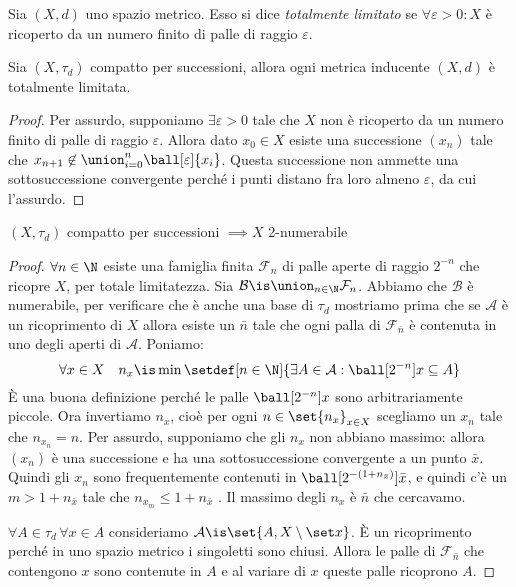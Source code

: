 \begin{defn}
	Sia $(X,d)$ uno spazio metrico.
	Esso si dice \emph{totalmente limitato} se $\forall \varepsilon > 0:X$
	è ricoperto da un numero finito di palle di raggio $\varepsilon$.
\end{defn}

\begin{prop}
	Sia $(X,\tau _d)$ compatto per successioni,
	allora ogni metrica inducente $(X,d)$ è totalmente limitata.
\end{prop}

\begin{proof}
	Per assurdo, supponiamo $\exists \varepsilon > 0$
	tale che $X$ non è ricoperto da un numero finito di palle di raggio $\varepsilon$.
	Allora dato $x_0 \in X$ esiste una successione $(x_n)$ tale che
	$x_{n+1}\not\in\union_{i=0}^n\ball[\varepsilon]{x_i}$.
	Questa successione non ammette una sottosuccessione convergente
	perché i punti distano fra loro almeno $\varepsilon$, da cui l'assurdo.
\end{proof}

\begin{prop}
	$(X, \tau _d)$ compatto per successioni $\implies X$ 2-numerabile
\end{prop}

\begin{proof}
	$\forall n \in \N$ esiste una famiglia finita $\mathcal{F}_n$ di palle aperte di raggio $2^{-n}$ che ricopre $X$, per totale limitatezza.
	Sia $\mathcal{B} \is \union _{n \in \N} \mathcal F_n$.
	Abbiamo che $\mathcal{B}$ è numerabile, per verificare che è anche una base di $\tau _d$ mostriamo prima che se $\mathcal{A}$ è un ricoprimento di $X$ allora esiste un $\bar n$ tale che ogni palla di $\mathcal F_{\bar n}$ è contenuta in uno degli aperti di $\mathcal{A}$.
	Poniamo:
	\[\forall x\in X\quad n_x\is\min\setdef[n\in\N]{\exists A\in\mathcal A:\ball[2^{-n}]x\subseteq A}\]
	È una buona definizione perché le palle $\ball[2^{-n}]x$ sono arbitrariamente piccole.
	Ora invertiamo $n_x$, cioè per ogni $n\in\set{n_x}_{x\in X}$ scegliamo un $x_n$ tale che $n_{x_n}=n$.
	Per assurdo, supponiamo che gli $n_x$ non abbiano massimo:
	allora $(x_n)$ è una successione e ha una sottosuccessione convergente a un punto $\bar x$.
	Quindi gli $x_n$ sono frequentemente contenuti in $\ball[2^{-(1+n_{\bar x})}]{\bar x}$,
	e quindi c'è un $m>1+n_{\bar x}$ tale che $n_{x_m}\le 1+n_{\bar x}$ \absurd.
	Il massimo degli $n_x$ è $\bar n$ che cercavamo.
	
	$\forall A \in \tau _d\,\forall x \in A$ consideriamo $\mathcal{A}\is\set{A, X\setminus\set x}$.
	È un ricoprimento perché in uno spazio metrico i singoletti sono chiusi.
	Allora le palle di $\mathcal F_{\bar n}$ che contengono $x$ sono contenute in $A$
	e al variare di $x$ queste palle ricoprono $A$.
\end{proof}

